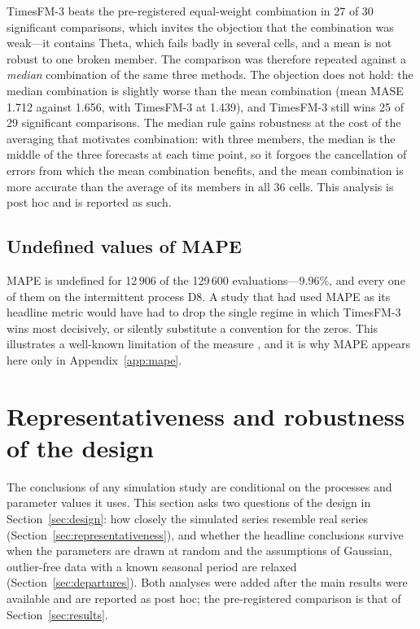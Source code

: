 \documentclass[11pt]{article}
\providecommand{\sectionref}[1]{Section~\ref{#1}}
\providecommand{\appendixref}[1]{Appendix~\ref{#1}}
\begin{document}
TimesFM-3 beats the pre-registered equal-weight combination in 27 of 30 significant
comparisons, which invites the objection that the combination was weak---it contains Theta,
which fails badly in several cells, and a mean is not robust to one broken member. The comparison
was therefore repeated against a \emph{median} combination of the same three methods. The
objection does not hold: the median combination is slightly worse than the mean combination
(mean MASE 1.712 against 1.656, with TimesFM-3 at 1.439), and TimesFM-3 still wins 25 of 29
significant comparisons. The median rule gains robustness at the cost of the averaging that
motivates combination: with three members, the median is the middle of the three forecasts at
each time point, so it forgoes the cancellation of errors from which the mean combination
benefits, and the mean combination is more accurate than the average of its members in all 36
cells. This analysis is post hoc and is reported as such.

\subsection{Undefined values of MAPE}
\label{sec:mape}

MAPE is undefined for 12\,906 of the 129\,600 evaluations---9.96\%, and every one of
them on the intermittent process D8. A study that had used MAPE as its headline metric would
have had to drop the single regime in which TimesFM-3 wins most decisively, or silently
substitute a convention for the zeros. This illustrates a well-known limitation of the measure
\citep{hyndman2006mase, kolassa2016count}, and it is why MAPE appears here only in
\appendixref{app:mape}.

\section{Representativeness and robustness of the design}
\label{sec:robustness}

The conclusions of any simulation study are conditional on the processes and parameter values it
uses. This section asks two questions of the design in \sectionref{sec:design}: how closely the
simulated series resemble real series (\sectionref{sec:representativeness}), and whether the
headline conclusions survive when the parameters are drawn at random and the assumptions of
Gaussian, outlier-free data with a known seasonal period are relaxed
(\sectionref{sec:departures}). Both analyses were added after the main results were available and
are reported as post hoc; the pre-registered comparison is that of \sectionref{sec:results}.
\end{document}
